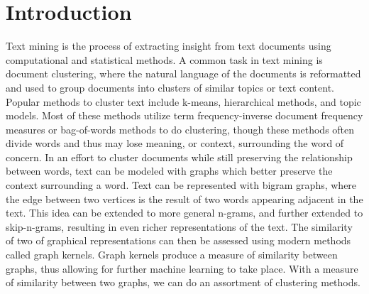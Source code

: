 %
%
%

\chapter{Introduction}
\label{introduction}

Text mining is the process of extracting insight from text documents using computational and statistical methods. A common task in text mining is document clustering, where the natural language of the documents is reformatted and used to group documents into clusters of similar topics or text content. Popular methods to cluster text include k-means, hierarchical methods, and topic models. Most of these methods utilize term frequency-inverse document frequency measures  or bag-of-words methods to do clustering, though these methods often divide words and thus may lose meaning, or context, surrounding the word of concern. In an effort to cluster documents while still preserving the relationship between words, text can be modeled with graphs which better preserve the context surrounding a word. Text can be represented with bigram graphs, where the edge between two vertices is the result of two words appearing adjacent in the text. This idea can be extended to more general n-grams, and further extended to skip-n-grams, resulting in even richer representations of the text. The similarity of two of graphical representations can then be assessed using modern methods called graph kernels. Graph kernels produce a measure of similarity between graphs, thus allowing for further machine learning to take place. With a measure of similarity between two graphs, we can do an assortment of clustering methods.



